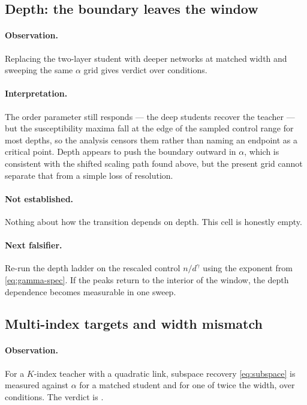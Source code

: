 \subsection{Depth: the boundary leaves the window}

\paragraph{Observation.}
Replacing the two-layer student with deeper networks at matched width and
sweeping the same $\alpha$ grid gives verdict
\emph{\AtlasDepthLadderVerdict{}} over \AtlasDepthLadderConditions{}
conditions.

\paragraph{Interpretation.}
The order parameter still responds --- the deep students recover the teacher ---
but the susceptibility maxima fall at the edge of the sampled control range for
most depths, so the analysis censors them rather than naming an endpoint as a
critical point. Depth appears to push the boundary outward in $\alpha$, which is
consistent with the shifted scaling path found above, but the present grid
cannot separate that from a simple loss of resolution.

\paragraph{Not established.}
Nothing about how the transition depends on depth. This cell is honestly empty.

\paragraph{Next falsifier.}
Re-run the depth ladder on the rescaled control $n/d^{\gamma}$ using the
exponent from \eqref{eq:gamma-spec}. If the peaks return to the interior of the
window, the depth dependence becomes measurable in one sweep.

\subsection{Multi-index targets and width mismatch}

\paragraph{Observation.}
For a $K$-index teacher with a quadratic link, subspace recovery
\eqref{eq:subspace} is measured against $\alpha$ for a matched student and for
one of twice the width, over \AtlasMultiIndexConditions{} conditions. The
verdict is \emph{\AtlasMultiIndexVerdict{}}.

